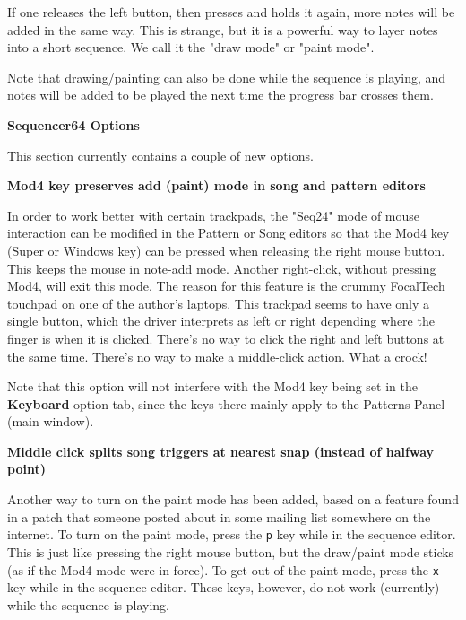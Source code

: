    If one releases the left button, then presses and holds it again,
   more notes will be added in the same way.
   This is strange, but it is a powerful way to layer notes into a short
   sequence.
   We call it the   "draw mode" or
     "paint mode".

   Note that drawing/painting can also be done while the sequence is playing,
   and notes will be added to be played the next time the progress bar crosses
   them.

   \textbf{Sequencer64 Options}

   This section currently contains a couple of new options.

   \label{new_mod4_mode}
   \textbf{Mod4 key preserves add (paint) mode in song and pattern editors}

   In order to work better with certain trackpads, the
   "Seq24" mode of mouse interaction can be modified in the
   Pattern or Song editors so that the Mod4 key (Super or Windows key)
   can be pressed when releasing the right mouse button.
   This keeps the mouse in note-add mode.
   Another right-click, without pressing Mod4, will exit this mode.
   The reason for this feature is the crummy FocalTech touchpad on one of
   the author's laptops.  This trackpad seems to have only a single button,
   which the driver interprets as left or right depending where the finger
   is when it is clicked.  There's no way to click the right and left
   buttons at the same time.  There's no way to make a middle-click action.
   What a crock!

   Note that this option will not interfere with the Mod4 key being set
   in the \textbf{Keyboard} option tab, since the keys there mainly apply to
   the Patterns Panel (main window).

   \label{new_split_mode}
   \textbf{Middle click splits song triggers at nearest snap (instead of
   halfway point)}


   Another way to turn on the paint mode has been added, based on a feature
   found in a patch that someone posted about in some mailing list somewhere on
   the internet.
   To turn on the paint mode, press the
   \texttt{p} key while in the sequence editor.
   This is just like pressing the right mouse button, but the draw/paint mode
   sticks (as if the Mod4 mode were in force).
   To get out of the paint mode, press the
   \texttt{x} key while in the sequence editor.
   These keys, however, do not work (currently) while the sequence is playing.

